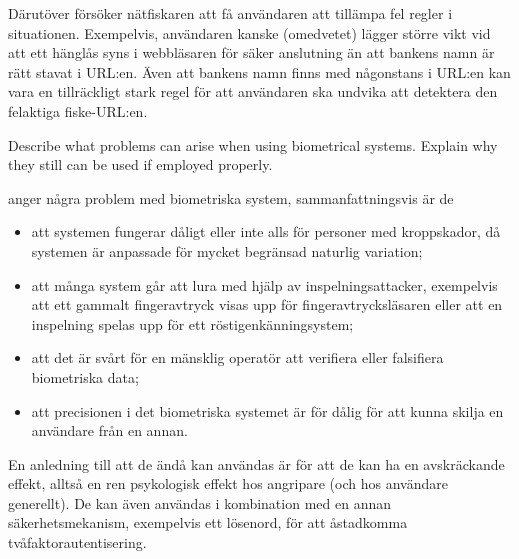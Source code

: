 \documentclass[svv,addpoints]{miunexam}
\begin{document}
\begin{questions}
\begin{parts}
\begin{solution}
      Därutöver försöker nätfiskaren att få användaren att tillämpa fel regler 
      i situationen.
      Exempelvis, användaren kanske (omedvetet) lägger större vikt vid att ett 
      hänglås syns i webbläsaren för säker anslutning än att bankens namn är 
      rätt stavat i URL:en.
      Även att bankens namn finns med någonstans i URL:en kan vara en 
      tillräckligt stark regel för att användaren ska undvika att detektera den 
      felaktiga fiske-URL:en.
    \end{solution}
  \end{parts}


  \question[5]\label{q:biometrics:E:C:A}
  Describe what problems can arise when using biometrical systems.
  Explain why they still can be used if employed properly.

  \begin{solution}
    \citet{Anderson2008sea} anger några problem med biometriska system, 
    sammanfattningsvis är de
    \begin{itemize}
      \item att systemen fungerar dåligt eller inte alls för personer med 
        kroppskador, då systemen är anpassade för mycket begränsad naturlig 
        variation;
      \item att många system går att lura med hjälp av inspelningsattacker, 
        exempelvis att ett gammalt fingeravtryck visas upp för 
        fingeravtrycksläsaren eller att en inspelning spelas upp för ett 
        röstigenkänningsystem;
      \item att det är svårt för en mänsklig operatör att verifiera eller 
        falsifiera biometriska data;
      \item att precisionen i det biometriska systemet är för dålig för att 
        kunna skilja en användare från en annan.
    \end{itemize}

    En anledning till att de ändå kan användas är för att de kan ha en 
    avskräckande effekt, alltså en ren psykologisk effekt hos angripare (och 
    hos användare generellt).
    De kan även användas i kombination med en annan säkerhetsmekanism, 
    exempelvis ett lösenord, för att åstadkomma tvåfaktorautentisering.
  \end{solution}
\end{questions}


\printbibliography
\end{document}
